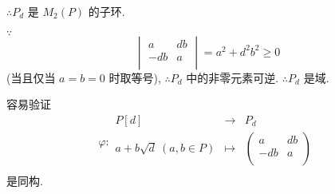 \documentclass[UTF8]{ctexart}
\begin{document}
$\therefore P_d$ 是 $M_2(P)$ 的子环.

$\because$
\[\begin{vmatrix}
    a & db \\
    -db & a \\
\end{vmatrix}=a^2+d^2b^2\geq0\]
(当且仅当 $a=b=0$ 时取等号), $\therefore P_d$ 中的非零元素可逆. $\therefore P_d$ 是域.

容易验证%
\[\varphi:\begin{array}{rcl}
    P[d] & \to & P_d \\
    a+b\sqrt{d}\ (a,b\in P) & \mapsto & \begin{pmatrix}
        a & db \\
        -db & a \\
    \end{pmatrix} \\
\end{array}\]
是同构.
\end{document}
